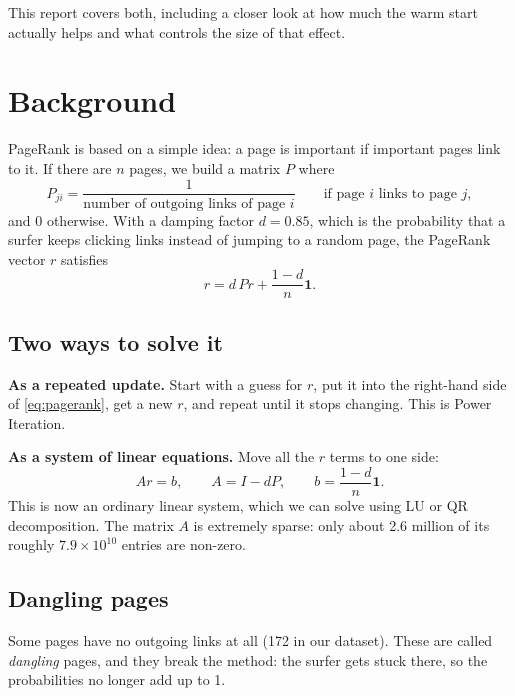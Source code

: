 \documentclass[11pt,a4paper]{article}
\begin{document}
This report covers both, including a closer look at how much the warm start actually
helps and what controls the size of that effect.

\section{Background}

PageRank is based on a simple idea: a page is important if important pages link to it.
If there are $n$ pages, we build a matrix $P$ where
\[
  P_{ji} = \frac{1}{\text{number of outgoing links of page } i}
  \qquad \text{if page } i \text{ links to page } j,
\]
and $0$ otherwise. With a damping factor $d = 0.85$, which is the probability that a
surfer keeps clicking links instead of jumping to a random page, the PageRank vector $r$
satisfies
\begin{equation}
  r = d\,P r + \frac{1-d}{n}\mathbf{1}.
  \label{eq:pagerank}
\end{equation}

\subsection{Two ways to solve it}

\textbf{As a repeated update.} Start with a guess for $r$, put it into the right-hand
side of \eqref{eq:pagerank}, get a new $r$, and repeat until it stops changing. This
is Power Iteration.

\textbf{As a system of linear equations.} Move all the $r$ terms to one side:
\begin{equation}
  A r = b, \qquad A = I - dP, \qquad b = \frac{1-d}{n}\mathbf{1}.
  \label{eq:linsys}
\end{equation}
This is now an ordinary linear system, which we can solve using LU or QR
decomposition. The matrix $A$ is extremely sparse: only about 2.6 million of its
roughly $7.9\times10^{10}$ entries are non-zero.

\subsection{Dangling pages}

Some pages have no outgoing links at all (172 in our dataset). These are called
\emph{dangling} pages, and they break the method: the surfer gets stuck there, so the
probabilities no longer add up to 1.
\end{document}
